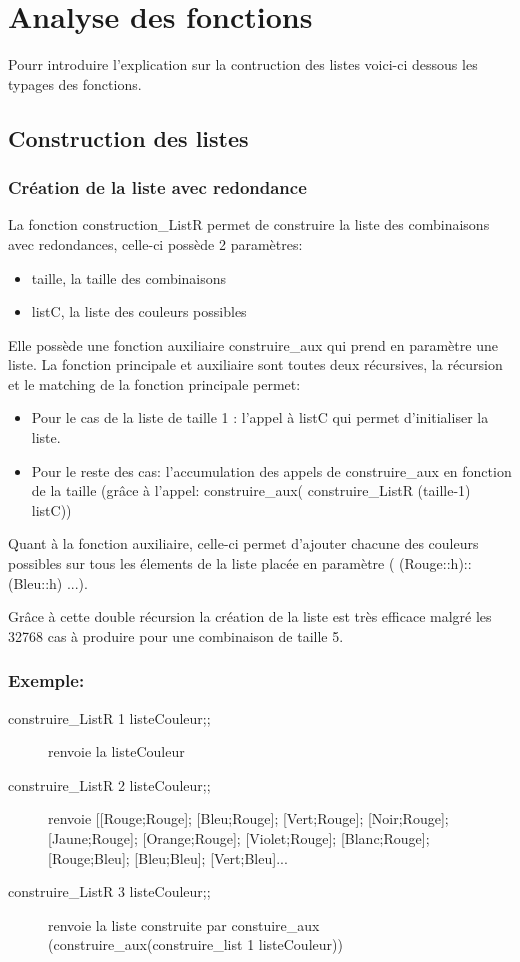 \documentclass[a4paper,twoside,12pt]{report}
\newcommand{\moncode}[1]{\begin{center}
                        
                        \end{center}}
\begin{document}
\chapter{Analyse des fonctions}
%
Pourr introduire l'explication sur la contruction des listes voici-ci dessous les typages des fonctions.
\moncode{listCouleur.mli}
%
\section{Construction des listes}
%
\moncode{construc.ml}
\subsection{Création de la liste avec redondance}
\par
La fonction construction\_ListR permet de construire la liste des combinaisons avec redondances, celle-ci possède 2 paramètres:
\begin{itemize}
\item taille, la taille des combinaisons
\item listC, la liste des couleurs possibles
\end{itemize}
\par
Elle possède une fonction auxiliaire construire\_aux qui prend en paramètre une liste.
La fonction principale et auxiliaire sont toutes deux récursives, la récursion et le matching de la fonction principale permet:
\begin{itemize}
\item Pour le cas de la liste de taille 1 : l'appel à listC qui permet d'initialiser la liste.
\item Pour le reste des cas: l'accumulation des appels de construire\_aux en fonction de la taille (grâce à l'appel: construire\_aux( construire\_ListR (taille-1) listC))
\end{itemize}
\par Quant à la fonction auxiliaire, celle-ci permet d'ajouter chacune des couleurs possibles sur tous les élements de la liste placée en paramètre ( (Rouge::h)::(Bleu::h) ...). 
\par Grâce à cette double récursion la création de la liste est très efficace malgré les 32768 cas à produire pour une combinaison de taille 5.
\subsection{Exemple:}
%
\begin{description}
 \item [construire\_ListR 1 listeCouleur;;] renvoie la listeCouleur
 \item [construire\_ListR 2 listeCouleur;;] renvoie [[Rouge;Rouge]; [Bleu;Rouge]; [Vert;Rouge]; [Noir;Rouge]; [Jaune;Rouge]; [Orange;Rouge]; [Violet;Rouge]; [Blanc;Rouge]; [Rouge;Bleu]; [Bleu;Bleu]; [Vert;Bleu]...
 \item [construire\_ListR 3 listeCouleur;;] renvoie la liste construite par constuire\_aux (construire\_aux(construire\_list 1 listeCouleur))
\end{description}
%
\end{document}
